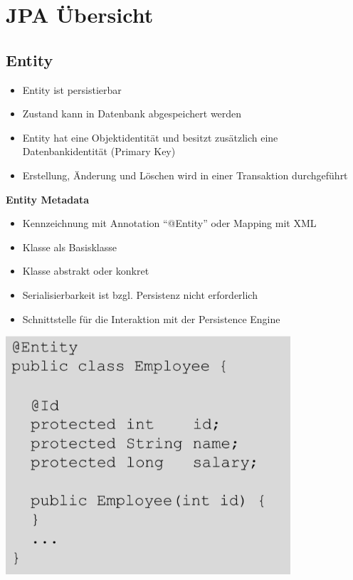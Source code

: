 \documentclass{report}
\newenvironment{Figure}
	{\par\medskip\noindent\minipage{\linewidth}}
	{\endminipage\par\medskip}
\theoremstyle{definition}
\theoremstyle{example}
\begin{document}
\section{JPA Übersicht}

\subsection{Entity}
\begin{itemize}
	\item Entity ist persistierbar
	\item Zustand kann in Datenbank abgespeichert werden
	\item Entity hat eine Objektidentität und besitzt zusätzlich eine Datenbankidentität (Primary Key)
	\item Erstellung, Änderung und Löschen wird in einer Transaktion durchgeführt
\end{itemize}

\textbf{Entity Metadata}
\begin{itemize}
	\item Kennzeichnung mit Annotation ``@Entity'' oder Mapping mit XML
	\item Klasse als Basisklasse
	\item Klasse abstrakt oder konkret
	\item Serialisierbarkeit ist bzgl. Persistenz nicht erforderlich
	\item Schnittstelle für die Interaktion mit der Persistence Engine
\end{itemize}

\begin{Figure}
\centering
\includegraphics[width=400px]{img/EntityBsp.png}
	\label{fig:Beispiel einer Entity}
\end{Figure}
\end{document}
